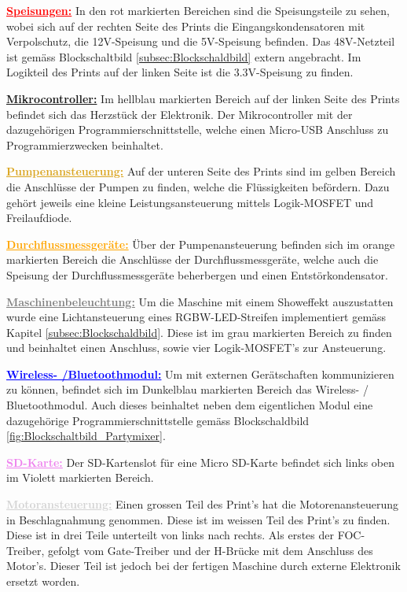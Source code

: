 \textcolor{red}{\textbf{\underline{Speisungen:}}}
In den rot markierten Bereichen sind die Speisungsteile zu sehen, wobei sich auf der rechten Seite des Prints die Eingangskondensatoren mit Verpolschutz, die 12V-Speisung und die 5V-Speisung befinden. Das 48V-Netzteil ist gemäss Blockschaltbild \ref{subsec:Blockschaldbild} extern angebracht. Im Logikteil des Prints auf der linken Seite ist die 3.3V-Speisung zu finden.

\textcolor{ProcessBlue}{\textbf{\underline{Mikrocontroller:}}}
Im hellblau markierten Bereich auf der linken Seite des Prints befindet sich das Herzstück der Elektronik. Der Mikrocontroller mit der dazugehörigen Programmierschnittstelle, welche einen Micro-USB Anschluss zu Programmierzwecken beinhaltet.

\textcolor{Goldenrod}{\textbf{\underline{Pumpenansteuerung:}}}
Auf der unteren Seite des Prints sind im gelben Bereich die Anschlüsse der Pumpen zu finden, welche die Flüssigkeiten befördern. Dazu gehört jeweils eine kleine Leistungsansteuerung mittels Logik-MOSFET und Freilaufdiode. 

\textcolor{orange}{\textbf{\underline{Durchflussmessgeräte:}}} Über der Pumpenansteuerung befinden sich im orange markierten Bereich die Anschlüsse der Durchflussmessgeräte, welche auch die Speisung der Durchflussmessgeräte beherbergen und einen Entstörkondensator.

\textcolor{gray}{\textbf{\underline{Maschinenbeleuchtung:}}}
Um die Maschine mit einem Showeffekt auszustatten wurde eine Lichtansteuerung eines RGBW-LED-Streifen implementiert gemäss Kapitel \ref{subsec:Blockschaldbild}. Diese ist im grau markierten Bereich zu finden und beinhaltet einen Anschluss, sowie vier Logik-MOSFET's zur Ansteuerung.

\textcolor{blue}{\textbf{\underline{Wireless- /Bluetoothmodul:}}}
Um mit externen Gerätschaften kommunizieren zu können, befindet sich im Dunkelblau markierten Bereich das Wireless- / Bluetoothmodul. Auch dieses beinhaltet neben dem eigentlichen Modul eine dazugehörige Programmierschnittstelle gemäss Blockschaldbild \ref{fig:Blockschaltbild_Partymixer}.

\textcolor{violet}{\textbf{\underline{SD-Karte:}}}
Der SD-Kartenslot für eine Micro SD-Karte befindet sich links oben im Violett markierten Bereich.


\textcolor{lightgray}{\textbf{\underline{Motoransteuerung:}}}
Einen grossen Teil des Print's hat die Motorenansteuerung in Beschlagnahmung genommen. Diese ist im weissen Teil des Print's zu finden. Diese ist in drei Teile unterteilt von links nach rechts. Als erstes der FOC-Treiber, gefolgt vom Gate-Treiber und der H-Brücke mit dem Anschluss des Motor's. Dieser Teil ist jedoch bei der fertigen Maschine durch externe Elektronik ersetzt worden. 

